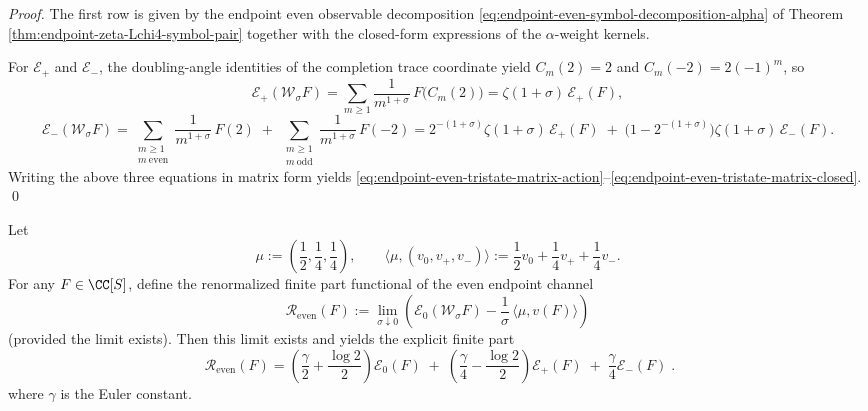 \begin{proof}
The first row is given by the endpoint even observable decomposition \eqref{eq:endpoint-even-symbol-decomposition-alpha} of Theorem \ref{thm:endpoint-zeta-Lchi4-symbol-pair} together with the closed-form expressions of the \(\alpha\)-weight kernels.
\par
For \(\mathcal E_{+}\) and \(\mathcal E_{-}\), the doubling-angle identities of the completion trace coordinate yield \(C_m(2)=2\) and \(C_m(-2)=2(-1)^m\), so
\[
\mathcal E_{+}(\mathcal W_\sigma F)
=\sum_{m\ge 1}\frac{1}{m^{1+\sigma}}\,F\!\bigl(C_m(2)\bigr)
=\zeta(1+\sigma)\,\mathcal E_{+}(F),
\]
\[
\mathcal E_{-}(\mathcal W_\sigma F)
=\sum_{\substack{m\ge 1\\ m\ \mathrm{even}}}\frac{1}{m^{1+\sigma}}\,F(2)
\;+\;
\sum_{\substack{m\ge 1\\ m\ \mathrm{odd}}}\frac{1}{m^{1+\sigma}}\,F(-2)
=2^{-(1+\sigma)}\zeta(1+\sigma)\,\mathcal E_{+}(F)
\;+\;\bigl(1-2^{-(1+\sigma)}\bigr)\zeta(1+\sigma)\,\mathcal E_{-}(F).
\]
Writing the above three equations in matrix form yields \eqref{eq:endpoint-even-tristate-matrix-action}--\eqref{eq:endpoint-even-tristate-matrix-closed}. \qed
\end{proof}

\begin{theorem}\label{thm:endpoint-even-finite-part-renormalization}
Let
\[
\mu:=\left(\frac12,\frac14,\frac14\right),\qquad
\langle \mu,(v_0,v_+,v_-)\rangle:=\frac12 v_0+\frac14 v_++\frac14 v_-.
\]
For any \(F\in\CC[S]\), define the renormalized finite part functional of the even endpoint channel
\begin{equation}\label{eq:endpoint-even-renormalized-finite-part-def}
\boxed{\;
\mathcal R_{\mathrm{even}}(F)
:=\lim_{\sigma\downarrow 0}\left(
\mathcal E_{0}(\mathcal W_\sigma F)
-\frac{1}{\sigma}\,\langle \mu,v(F)\rangle
\right)\;}
\end{equation}
(provided the limit exists).
Then this limit exists and yields the explicit finite part
\begin{equation}\label{eq:endpoint-even-renormalized-finite-part-closed}
\boxed{\;
\mathcal R_{\mathrm{even}}(F)
=\left(\frac{\gamma}{2}+\frac{\log 2}{2}\right)\mathcal E_{0}(F)
\;+\;\left(\frac{\gamma}{4}-\frac{\log 2}{2}\right)\mathcal E_{+}(F)
\;+\;\frac{\gamma}{4}\mathcal E_{-}(F)\; }.
\end{equation}
where \(\gamma\) is the Euler constant.
\end{theorem}


